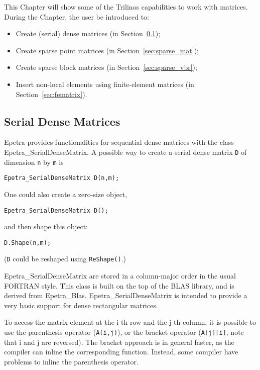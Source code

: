 This Chapter will show some of the Trilinos capabilities to work with
matrices. During the Chapter, the user be introduced to:
\begin{itemize}
\item Create (serial) dense matrices (in Section~\ref{sec:dense_mat});
\item Create sparse point matrices (in Section~\ref{sec:sparse_mat});
\item Create sparse block matrices (in Section~\ref{sec:sparse_vbr});
\item Insert non-local elements using finite-element matrices (in
  Section~\ref{sec:fematrix}).
\end{itemize}


\subsection{Serial Dense Matrices}
\label{sec:dense_mat}

Epetra provides functionalities for sequential dense matrices with the
class Epetra\_SerialDenseMatrix.  A possible way to create a serial
dense matrix \verb!D! of dimension \verb!n!  by \verb!m! is
\begin{verbatim}
Epetra_SerialDenseMatrix D(n,m);
\end{verbatim}
One could also create a zero-size object, 
\begin{verbatim}
Epetra_SerialDenseMatrix D();
\end{verbatim}
and then shape this object:
\begin{verbatim}
D.Shape(n,m);
\end{verbatim}
({\tt D} could be reshaped using \verb!ReShape()!.)

Epetra\_SerialDenseMatrix are stored in a column-major order in the
usual FORTRAN style. This class is built on the top of the BLAS
library, and is derived from Epetra\_Blas. Epetra\_SerialDenseMatrix is
intended to provide a very basic support for dense rectangular matrices.

\smallskip

To access the matrix element at the i-th row and the j-th column, it is
possible to use the parenthesis operator (\verb!A(i,j)!), or the bracket
operator (\verb!A[j][i]!, note that i and j are reversed). The bracket
approach is in general faster, as the compiler can inline the
corresponding function. Instead, some compiler have problems to inline
the parenthesis operator.

